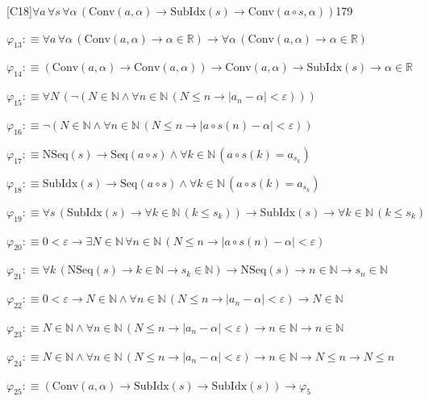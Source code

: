 \begin{fullproof}{[C18]}{$\forall a\,\forall s\,\forall \alpha\,(\mathrm{Conv}(a,\alpha) \to \mathrm{SubIdx}(s) \to \mathrm{Conv}(a \circ s,\alpha))$}{179}
\begin{abbrevlist}
\item $\varphi_{13} :\equiv \forall a\,\forall \alpha\,(\mathrm{Conv}(a,\alpha) \to \alpha \in \mathbb{R}) \to \forall \alpha\,(\mathrm{Conv}(a,\alpha) \to \alpha \in \mathbb{R})$
\item $\varphi_{14} :\equiv (\mathrm{Conv}(a,\alpha) \to \mathrm{Conv}(a,\alpha)) \to \mathrm{Conv}(a,\alpha) \to \mathrm{SubIdx}(s) \to \alpha \in \mathbb{R}$
\item $\varphi_{15} :\equiv \forall N\,(\neg (N \in \mathbb{N} \land \forall n \in \mathbb{N}\,(N \leq n \to \lvert a_{n} - \alpha \rvert < \varepsilon)))$
\item $\varphi_{16} :\equiv \neg (N \in \mathbb{N} \land \forall n \in \mathbb{N}\,(N \leq n \to \lvert a \circ s(n) - \alpha \rvert < \varepsilon))$
\item $\varphi_{17} :\equiv \mathrm{NSeq}(s) \to \mathrm{Seq}(a \circ s) \land \forall k \in \mathbb{N}\,(a \circ s(k) = a_{s_{k}})$
\item $\varphi_{18} :\equiv \mathrm{SubIdx}(s) \to \mathrm{Seq}(a \circ s) \land \forall k \in \mathbb{N}\,(a \circ s(k) = a_{s_{k}})$
\item $\varphi_{19} :\equiv \forall s\,(\mathrm{SubIdx}(s) \to \forall k \in \mathbb{N}\,(k \leq s_{k})) \to \mathrm{SubIdx}(s) \to \forall k \in \mathbb{N}\,(k \leq s_{k})$
\item $\varphi_{20} :\equiv 0 < \varepsilon \to \exists N \in \mathbb{N}\,\forall n \in \mathbb{N}\,(N \leq n \to \lvert a \circ s(n) - \alpha \rvert < \varepsilon)$
\item $\varphi_{21} :\equiv \forall k\,(\mathrm{NSeq}(s) \to k \in \mathbb{N} \to s_{k} \in \mathbb{N}) \to \mathrm{NSeq}(s) \to n \in \mathbb{N} \to s_{n} \in \mathbb{N}$
\item $\varphi_{22} :\equiv 0 < \varepsilon \to N \in \mathbb{N} \land \forall n \in \mathbb{N}\,(N \leq n \to \lvert a_{n} - \alpha \rvert < \varepsilon) \to N \in \mathbb{N}$
\item $\varphi_{23} :\equiv N \in \mathbb{N} \land \forall n \in \mathbb{N}\,(N \leq n \to \lvert a_{n} - \alpha \rvert < \varepsilon) \to n \in \mathbb{N} \to n \in \mathbb{N}$
\item $\varphi_{24} :\equiv N \in \mathbb{N} \land \forall n \in \mathbb{N}\,(N \leq n \to \lvert a_{n} - \alpha \rvert < \varepsilon) \to n \in \mathbb{N} \to N \leq n \to N \leq n$
\item $\varphi_{25} :\equiv (\mathrm{Conv}(a,\alpha) \to \mathrm{SubIdx}(s) \to \mathrm{SubIdx}(s)) \to \varphi_{5}$

\end{abbrevlist}
\end{fullproof}
